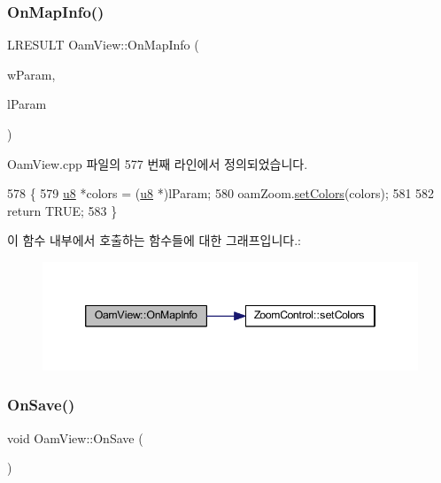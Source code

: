 \subsubsection{\texorpdfstring{On\+Map\+Info()}{OnMapInfo()}}
{\footnotesize\ttfamily L\+R\+E\+S\+U\+LT Oam\+View\+::\+On\+Map\+Info (\begin{DoxyParamCaption}\item[{W\+P\+A\+R\+AM}]{w\+Param,  }\item[{L\+P\+A\+R\+AM}]{l\+Param }\end{DoxyParamCaption})}



Oam\+View.\+cpp 파일의 577 번째 라인에서 정의되었습니다.


\begin{DoxyCode}
578 \{
579   \mbox{\hyperlink{_system_8h_aed742c436da53c1080638ce6ef7d13de}{u8}} *colors = (\mbox{\hyperlink{_system_8h_aed742c436da53c1080638ce6ef7d13de}{u8}} *)lParam;
580   oamZoom.\mbox{\hyperlink{class_zoom_control_a97501cc16d3068eefa1b5d9d23e9d0d9}{setColors}}(colors);
581   
582   \textcolor{keywordflow}{return} TRUE;
583 \}
\end{DoxyCode}
이 함수 내부에서 호출하는 함수들에 대한 그래프입니다.\+:
\nopagebreak
\begin{figure}[H]
\begin{center}
\leavevmode
\includegraphics[width=346pt]{class_oam_view_a139d46b95c3f0a9198e7d4fc134f88c2_cgraph}
\end{center}
\end{figure}
\mbox{\label{class_oam_view_adb535d2f90a5c8edce8cb900e64a5854}} 
\subsubsection{\texorpdfstring{On\+Save()}{OnSave()}}
{\footnotesize\ttfamily void Oam\+View\+::\+On\+Save (\begin{DoxyParamCaption}{ }\end{DoxyParamCaption})\hspace{0.3cm}{\ttfamily [protected]}}



